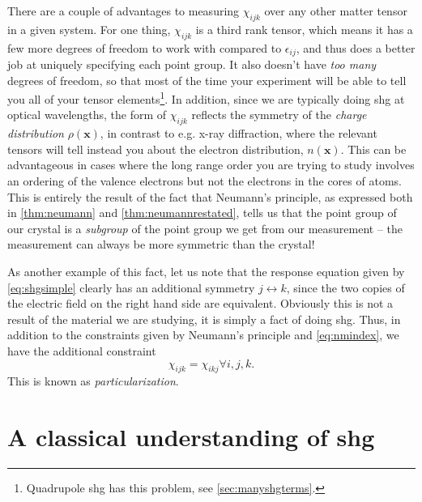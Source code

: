 There are a couple of advantages to measuring $\chi_{ijk}$ over any other matter tensor in a given system.
For one thing, $\chi_{ijk}$ is a third rank tensor, which means it has a few more degrees of freedom to work with compared to $\epsilon_{ij}$, and thus does a better job at uniquely specifying each point group.
It also doesn't have \emph{too many} degrees of freedom, so that most of the time your experiment will be able to tell you all of your tensor elements\footnote{Quadrupole \gls{shg} has this problem, see \cref{sec:manyshgterms}.}.
In addition, since we are typically doing \gls{shg} at optical wavelengths, the form of $\chi_{ijk}$ reflects the symmetry of the \emph{charge distribution} $\rho(\bm{x})$, in contrast to e.g. x-ray diffraction, where the relevant tensors will tell instead you about the electron distribution, $n(\bm{x})$.
This can be advantageous in cases where the long range order you are trying to study involves an ordering of the valence electrons but not the electrons in the cores of atoms.
This is entirely the result of the fact that Neumann's principle, as expressed both in \cref{thm:neumann} and \cref{thm:neumannrestated}, tells us that the point group of our crystal is a \emph{subgroup} of the point group we get from our measurement -- the measurement can always be more symmetric than the crystal!

As another example of this fact, let us note that the response equation given by \cref{eq:shgsimple} clearly has an additional symmetry $j \leftrightarrow k$, since the two copies of the electric field on the right hand side are equivalent.
Obviously this is not a result of the material we are studying, it is simply a fact of doing \gls{shg}.
Thus, in addition to the constraints given by Neumann's principle and \cref{eq:nmindex}, we have the additional constraint
\begin{equation}
\chi_{ijk} = \chi_{ikj} \forall i,j,k.
\end{equation}
This is known as \emph{particularization}\cite{birss}.

\section{A classical understanding of \gls{shg}}

